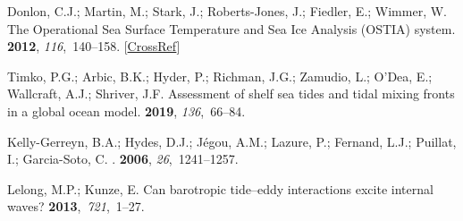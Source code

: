 \documentclass[jmse,article,accept,moreauthors,pdftex]{Definitions/mdpi}
\begin{document}
\begin{thebibliography}{999}
Donlon, C.J.; Martin, M.; Stark, J.; Roberts-Jones, J.; Fiedler, E.; Wimmer, W.
\newblock The Operational Sea Surface Temperature and Sea Ice Analysis (OSTIA)
system.
 {\bf 2012}, {\em 116},~140--158.
 [\href{http://dx.doi.org/10.1016/j.rse.2010.10.017}{CrossRef}]

Timko, P.G.; Arbic, B.K.; Hyder, P.; Richman, J.G.; Zamudio, L.; O'Dea, E.;
Wallcraft, A.J.; Shriver, J.F.
\newblock Assessment of shelf sea tides and tidal mixing fronts in a global
ocean model.
 {\bf 2019}, {\em 136},~66--84.

Kelly-Gerreyn, B.A.; Hydes, D.J.; J{\'{e}}gou, A.M.; Lazure, P.; Fernand, L.J.;
Puillat, I.; Garcia-Soto, C.
.
 {\bf 2006}, {\em 26},~1241--1257.

Lelong, M.P.; Kunze, E.
\newblock Can barotropic tide–eddy interactions excite internal waves?
 {\bf 2013},~{\em 721},~1--27.

\end{thebibliography}



\end{document}
